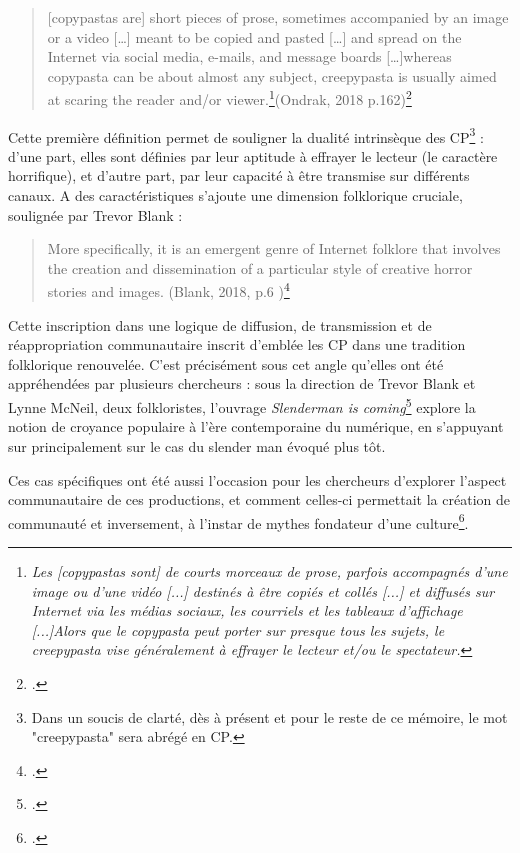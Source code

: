 \documentclass[12pt,a4paper,oneside,titlepage]{book} %
\begin{document}
	\begin{quotation}
		[copypastas are] short pieces of prose, sometimes accompanied by an image or a video […] meant to be copied and pasted […] and spread on the Internet via social media, e-mails, and message boards […]whereas copypasta can be about almost any subject, creepypasta is usually aimed at scaring the reader and/or viewer.\footnote{\emph{Les [copypastas sont] de courts morceaux de prose, parfois accompagnés d'une image ou d'une vidéo [...] destinés à être copiés et collés [...] et diffusés sur Internet via les médias sociaux, les courriels et les tableaux d'affichage [...]Alors que le copypasta peut porter sur presque tous les sujets, le creepypasta vise généralement à effrayer le lecteur et/ou le spectateur.}}(Ondrak, 2018 p.162)\footcite{ondrak_spectres_2018}
	\end{quotation}
	\par
	Cette première définition permet de souligner la dualité intrinsèque des CP\footnote{Dans un soucis de clarté, dès à présent et pour le reste de ce mémoire, le mot "creepypasta" sera abrégé en CP.} : d'une part, elles sont définies par leur aptitude à effrayer le lecteur (le caractère horrifique), et d'autre part, par leur capacité à être transmise sur différents canaux. 
    A des caractéristiques s'ajoute une dimension folklorique cruciale, soulignée par Trevor Blank :
\begin{quotation}
    More specifically, it is an emergent genre of Internet folklore that involves the creation and dissemination of a particular style of creative horror stories and images. (Blank, 2018, p.6 )\footcite{blank_slender_2018}
\end{quotation}
Cette inscription dans une logique de diffusion, de transmission et de réappropriation communautaire inscrit d’emblée les CP dans une tradition folklorique renouvelée. C’est précisément sous cet angle qu’elles ont été appréhendées par plusieurs chercheurs : sous la direction de Trevor Blank et Lynne McNeil, deux folkloristes, l'ouvrage \textit{Slenderman is coming}\footcite{blank_slender_2018} explore la notion de croyance populaire à l'ère contemporaine du numérique, en s'appuyant sur principalement sur le cas du slender man évoqué plus tôt. 

Ces cas spécifiques ont été aussi l'occasion pour les chercheurs d'explorer l'aspect communautaire de ces productions, et comment celles-ci permettait la création de communauté et inversement, à l'instar de mythes fondateur d'une culture\footcite{chess2014folklore}.
\end{document}
